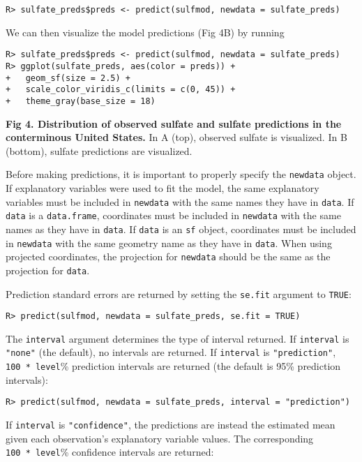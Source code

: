 \documentclass[10pt,letterpaper]{article}
\begin{document}
\begin{verbatim}
R> sulfate_preds$preds <- predict(sulfmod, newdata = sulfate_preds)
\end{verbatim}

We can then visualize the model predictions (Fig 4B) by running

\begin{verbatim}
R> sulfate_preds$preds <- predict(sulfmod, newdata = sulfate_preds)
R> ggplot(sulfate_preds, aes(color = preds)) +
+   geom_sf(size = 2.5) +
+   scale_color_viridis_c(limits = c(0, 45)) +
+   theme_gray(base_size = 18)
\end{verbatim}

\textbf{Fig 4. Distribution of observed sulfate and sulfate predictions
in the conterminous United States.} In A (top), observed sulfate is
visualized. In B (bottom), sulfate predictions are visualized.

Before making predictions, it is important to properly specify the
\texttt{newdata} object. If explanatory variables were used to fit the
model, the same explanatory variables must be included in
\texttt{newdata} with the same names they have in \texttt{data}. If
\texttt{data} is a \texttt{data.frame}, coordinates must be included in
\texttt{newdata} with the same names as they have in \texttt{data}. If
\texttt{data} is an \texttt{sf} object, coordinates must be included in
\texttt{newdata} with the same geometry name as they have in
\texttt{data}. When using projected coordinates, the projection for
\texttt{newdata} should be the same as the projection for \texttt{data}.

Prediction standard errors are returned by setting the \texttt{se.fit}
argument to \texttt{TRUE}:

\begin{verbatim}
R> predict(sulfmod, newdata = sulfate_preds, se.fit = TRUE)
\end{verbatim}

The \texttt{interval} argument determines the type of interval returned.
If \texttt{interval} is \texttt{"none"} (the default), no intervals are
returned. If \texttt{interval} is \texttt{"prediction"},
\texttt{100\ *\ level}\% prediction intervals are returned (the default
is 95\% prediction intervals):

\begin{verbatim}
R> predict(sulfmod, newdata = sulfate_preds, interval = "prediction")
\end{verbatim}

If \texttt{interval} is \texttt{"confidence"}, the predictions are
instead the estimated mean given each observation's explanatory variable
values. The corresponding \texttt{100\ *\ level}\% confidence intervals
are returned:
\end{document}

